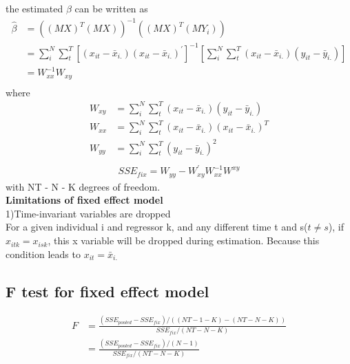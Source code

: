 \documentclass[a4paper]{article}
\begin{document}
the estimated $\beta$ can be written as
\begin{align*}
\hat \beta & = ((MX)^T(MX))^{-1}((MX)^T(MY_i)) \\
               & =\sum_i^N\sum_t^T[(x_{it}-\bar x_{i.})(x_{it}- \bar x_{i.})^{'}]^{-1}[\sum_i^N\sum_t^T(x_{it}-\bar x_{i.})(y_{it}- \bar y_{i.})] \\
               & = W_{xx}^{-1}W_{xy}\\
\end{align*}
where 
\begin{align*}
W_{xy} &= \sum_i^N\sum_t^T(x_{it}-\bar x_{i.})(y_{it}- \bar y_{i.}) \\
W_{xx} &= \sum_i^N\sum_t^T(x_{it}-\bar x_{i.})(x_{it}- \bar x_{i.})^T\\
W_{yy} &= \sum_i^N\sum_t^T(y_{it}-\bar y_{i.})^2\\
\end{align*}
\begin{align*}
SSE_{fix} = W_{yy} - W^{'}_{xy}W^{-1}_{xx}W^{xy}
\end{align*}
with NT - N - K degrees of freedom.\\
{\bf Limitations of fixed effect model}\\
1)Time-invariant variables are dropped\\
For a given individual i and regressor k, and any different time t and s($t \neq s$), if $x_{itk}=x_{isk}$, this x variable will be dropped during estimation. Because this condition leads to $x_{it} = \bar x_{i.}$\\  
\subsection{F test for fixed effect model}
\begin{align*}
F & = \frac{(SSE_{pooled}-SSE_{fix})/((NT-1-K)-(NT-N-K))}{SSE_{fix}/(NT-N-K)} \\
&= \frac{(SSE_{pooled}-SSE_{fix})/(N-1)}{SSE_{fix}/(NT-N-K)}
\end{align*}
\end{document}
